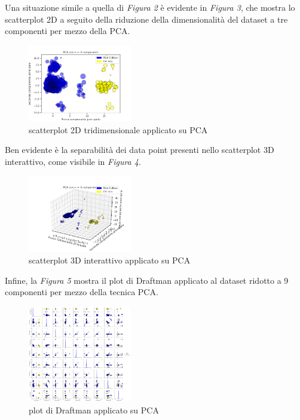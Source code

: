 \documentclass[11pt,a4paper,twocolumn]{article}
\begin{document}
 	 Una situazione simile a quella di \emph{Figura 2} è evidente in \emph{Figura 3}, che mostra lo scatterplot 2D a seguito della riduzione della dimensionalità del dataset a tre componenti per mezzo della PCA. 

	\begin{figure}[h]
		\centering
		\includegraphics[width=0.4\textwidth]{img/PCA_2Dnc3.png}
		\caption{scatterplot 2D tridimensionale applicato su PCA}
	\end{figure}

	Ben evidente è la separabilità dei data point presenti nello scatterplot 3D interattivo, come visibile in \emph{Figura 4}.

	\begin{figure}[h]
		\centering
		\includegraphics[width=0.4\textwidth]{img/PCA_i3D.png}
		\caption{scatterplot 3D interattivo applicato su PCA}
	\end{figure}

	Infine, la \emph{Figura 5} mostra il plot di Draftman applicato al dataset ridotto a 9 componenti per mezzo della tecnica PCA.

	\begin{figure}[h]
		\centering
		\includegraphics[width=0.4\textwidth]{img/PCA_SPLOM.png}
		\caption{plot di Draftman applicato su PCA}
	\end{figure}
\end{document}
